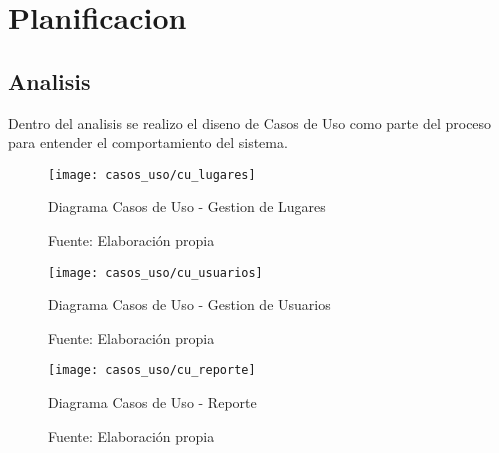   \chapter{Planificacion}
  \label{chap:planificacion}


    \section{Analisis}
    \label{sec:Analisis}

      Dentro del analisis se realizo el diseno de Casos de Uso como parte del proceso para entender el comportamiento del sistema. \cite{casos_uso}

  \begin{figure}[H]
    \begin{center}
      \texttt{[image: casos\_uso/cu\_lugares]}
    \end{center}
    \caption{Diagrama Casos de Uso - Gestion de Lugares }
    \label{fig:cu_lugares}
    \caption*{Fuente: Elaboración propia}
  \end{figure}

  

  \begin{figure}[H]
    \begin{center}
      \texttt{[image: casos\_uso/cu\_usuarios]}
    \end{center}
    \caption{Diagrama Casos de Uso - Gestion de Usuarios }
    \label{fig:cu_usuarios}
    \caption*{Fuente: Elaboración propia}
  \end{figure}

  


  \begin{figure}[H]
    \begin{center}
      \texttt{[image: casos\_uso/cu\_reporte]}
    \end{center}
    \caption{Diagrama Casos de Uso - Reporte }
    \label{fig:cu_reporte}
    \caption*{Fuente: Elaboración propia}
  \end{figure}

  





